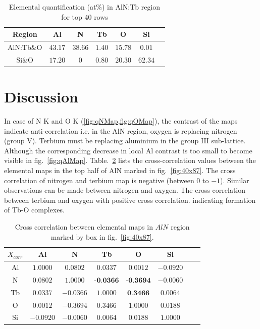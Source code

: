 \documentclass[%
 aip,
rsi,%
 amsmath,amssymb,
 reprint,%
]{revtex4-1}
\begin{document}
\begin{table}
	\caption{Elemental quantification (at\%) in AlN:Tb region for top 40 rows}
    \label{tab:atper}
    \begin{ruledtabular}
    	\begin{tabular}{ccccccc}
        	Region&Al&N&Tb&O&Si	\\ \hline
            AlN:Tb\&O&$43.17$&$38.66$&$1.40$&$15.78$&$0.01$ \\
            Si\&O &$17.20$&$0$&$0.80$&$20.30$&$62.34$
    	\end{tabular}
    \end{ruledtabular}
\end{table}

\section{Discussion} %
\label{sec:discussion}
In case of N K and O K (\cref{fig:qNMap,fig:qOMap}), the contrast of the maps indicate anti-correlation i.e. in the AlN region, oxygen is replacing nitrogen (group V). Terbium must be replacing aluminium in the group III sub-lattice. Although the corresponding decrease in local Al contrast is too small to become visible in fig.~\ref{fig:qAlMap}. Table.~\ref{tab:xcorr} lists the cross-correlation values between the elemental maps in the top half of AlN marked in fig.~\ref{fig:40x87}. The cross correlation of nitrogen and terbium map is negative (between $0$ to $-1$). Similar observations can be made between nitrogen and oxygen. The cross-correlation between terbium and oxygen with positive cross correlation.  indicating formation of Tb-O complexes.
\begin{table}
	\caption{Cross correlation between elemental maps in $AlN$ region marked by box in fig.~\ref{fig:40x87}.}
    \label{tab:xcorr}
    \begin{ruledtabular}
    	\begin{tabular}{cccccccc}
        	$X_{corr}$&Al&N&Tb&O&Si													\\ \hline
            Al& $1.0000$& $0.0802$& $0.0337$& $0.0012$&$-0.0920$					\\
             N& $0.0802$& $1.0000$& $\textbf{-0.0366}$&$\textbf{-0.3694}$&$-0.0060$	\\
            Tb& $0.0337$&$-0.0366$& $1.0000$& $\textbf{0.3466}$&$0.0064$			\\
             O& $0.0012$&$-0.3694$&	$0.3466$& $1.0000$&$0.0188$						\\
            Si&$-0.0920$&$-0.0060$&$0.0064$&$0.0188$& $1.0000$
    	\end{tabular}
    \end{ruledtabular}
\end{table}
\end{document}
